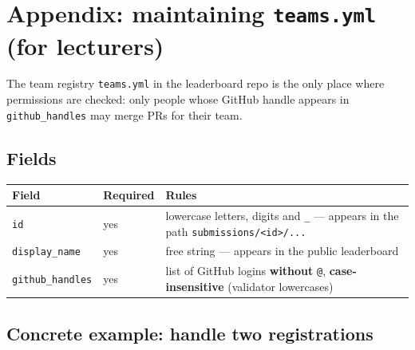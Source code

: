 \documentclass[
  english,
  letterpaper,
]{scrbook}
\newcounter{none} %
\begin{document}
\section*{\texorpdfstring{Appendix: maintaining \texttt{teams.yml} (for
lecturers)}{Appendix: maintaining teams.yml (for lecturers)}}\label{sec-teams-yml-anhang}


The team registry \texttt{teams.yml} in the leaderboard repo is the only
place where permissions are checked: only people whose GitHub handle
appears in \texttt{github\_handles} may merge PRs for their team.

\subsection{Fields}\label{fields}

{\def\LTcaptype{none} %
\begin{longtable}[]{@{}
  >{\raggedright\arraybackslash}p{}
  >{\raggedright\arraybackslash}p{}
  >{\raggedright\arraybackslash}p{}@{}}
\toprule\noalign{}
\begin{minipage}[b]{\linewidth}\raggedright
Field
\end{minipage} & \begin{minipage}[b]{\linewidth}\raggedright
Required
\end{minipage} & \begin{minipage}[b]{\linewidth}\raggedright
Rules
\end{minipage} \\
\midrule\noalign{}
\endhead
\bottomrule\noalign{}
\endlastfoot
\texttt{id} & yes & lowercase letters, digits and \texttt{\_} ---
appears in the path
\texttt{submissions/\textless{}id\textgreater{}/...} \\
\texttt{display\_name} & yes & free string --- appears in the public
leaderboard \\
\texttt{github\_handles} & yes & list of GitHub logins \textbf{without}
\texttt{@}, \textbf{case-insensitive} (validator lowercases) \\
\end{longtable}
}

\subsection{Concrete example: handle two
registrations}\label{concrete-example-handle-two-registrations}
\end{document}
